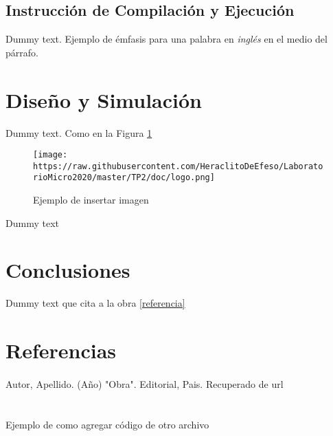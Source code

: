 \documentclass{article}
\begin{document}
\subsection{Instrucción de Compilación y Ejecución}
Dummy text. Ejemplo de émfasis para una palabra en \textit{inglés} en el medio del párrafo.

\section{Diseño y Simulación}
Dummy text. Como en la Figura \ref{ejemplo-imagen}
\begin{figure}[h]
    \centering
    \texttt{[image: https://raw.githubusercontent.com/HeraclitoDeEfeso/LaboratorioMicro2020/master/TP2/doc/logo.png]}
    \caption{Ejemplo de insertar imagen}
    \label{ejemplo-imagen}
\end{figure}
\clearpage 
Dummy text

\section{Conclusiones}
Dummy text que cita a la obra \ref{referencia}

\section{Referencias}
\setcounter{secnumdepth}{4}
\renewcommand{\theparagraph}{[\arabic{paragraph}]}
\paragraph{} Autor, Apellido. (Año) "Obra". Editorial, Pais. Recuperado de url\label{referencia}

\appendix
\renewcommand\thesection{Apéndice \Alph{section}}

\section{}
Ejemplo de como agregar código de otro archivo


\section{}
\end{document}
